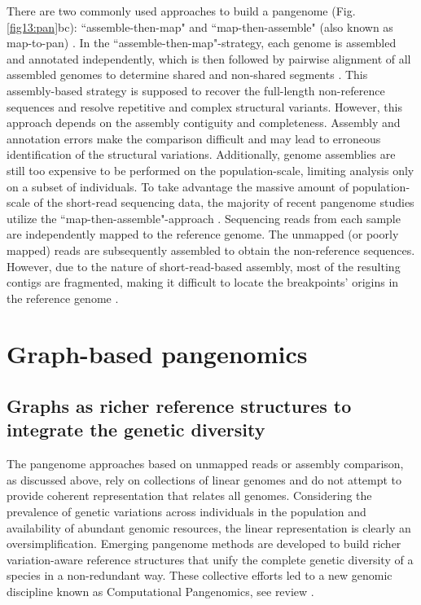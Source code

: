\documentclass[../main.tex]{subfiles}
\begin{document}
There are two commonly used approaches to build a pangenome (Fig. \ref{fig13:pan}bc): “assemble-then-map" and “map-then-assemble" (also known as map-to-pan) \citep{golicz2020pangenomics}. In the “assemble-then-map"-strategy, each genome is assembled and annotated independently, which is then followed by pairwise alignment of all assembled genomes to determine shared and non-shared segments \citep{duan2019hupan,li2019towards,eisfeldt2020discovery}. This assembly-based strategy is supposed to recover the full-length non-reference sequences and resolve repetitive and complex structural variants. However, this approach depends on the assembly contiguity and completeness. Assembly and annotation errors make the comparison difficult and may lead to erroneous identification of the structural variations. Additionally, genome assemblies are still too expensive to be performed on the population-scale, limiting analysis only on a subset of individuals. To take advantage the massive amount of population-scale of the short-read sequencing data, the majority of  recent pangenome studies utilize the “map-then-assemble"-approach \citep{holden2018assembly,laine2019exploring,sherman2019assembly}. Sequencing reads from each sample are independently mapped to the reference genome. The  unmapped (or poorly mapped) reads are subsequently assembled to obtain the non-reference sequences. However, due to the nature of short-read-based assembly, most of the resulting contigs are fragmented, making it difficult to locate the breakpoints’ origins in the reference genome \citep{sherman2019assembly}. 

\section{Graph-based pangenomics}

\subsection{Graphs as richer reference structures to integrate the genetic diversity}

The pangenome approaches based on unmapped reads or assembly comparison, as discussed above, rely on collections of linear genomes and do not attempt to provide coherent representation that relates all genomes. Considering the prevalence of genetic variations across individuals in the population and availability of abundant genomic resources, the linear representation is clearly an oversimplification. Emerging pangenome methods are developed to build richer variation-aware reference structures that unify the complete genetic diversity of a species in a non-redundant way. These collective efforts led to a new genomic discipline known as Computational Pangenomics, see review \citep{paten2017genome,computational2018computational,eizenga2020pangenome}.
\end{document}
